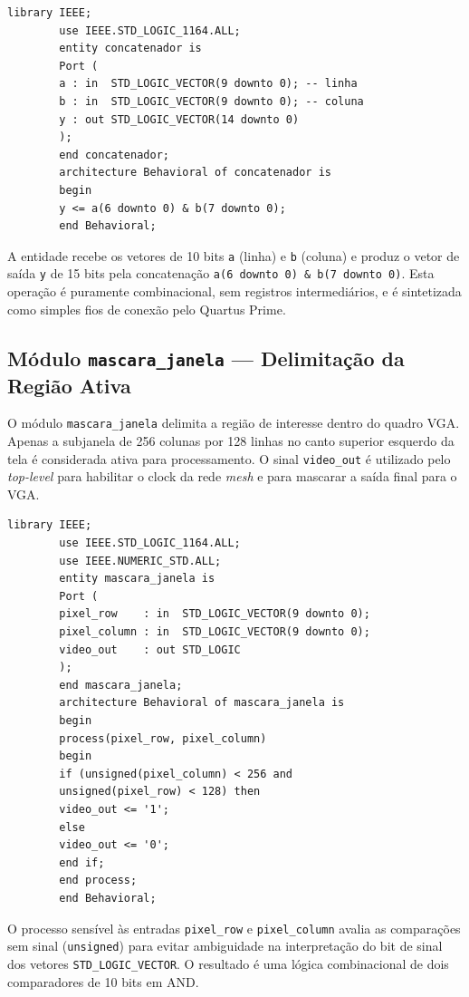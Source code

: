 \documentclass[12pt, a4paper]{article}
\begin{document}
	\begin{lstlisting}[style=vhdl, caption={\texttt{concatenador.vhd} --- Concatenação de coordenadas de pixel para endereçamento da ROM de imagem.}, label={lst:concat}]
		library IEEE;
		use IEEE.STD_LOGIC_1164.ALL;
		entity concatenador is
		Port (
		a : in  STD_LOGIC_VECTOR(9 downto 0); -- linha
		b : in  STD_LOGIC_VECTOR(9 downto 0); -- coluna
		y : out STD_LOGIC_VECTOR(14 downto 0)
		);
		end concatenador;
		architecture Behavioral of concatenador is
		begin
		y <= a(6 downto 0) & b(7 downto 0);
		end Behavioral;
	\end{lstlisting}
	
	A entidade recebe os vetores de 10 bits \texttt{a} (linha) e \texttt{b}
	(coluna) e produz o vetor de saída \texttt{y} de 15 bits pela concatenação
	\texttt{a(6 downto 0) \& b(7 downto 0)}. Esta operação é puramente
	combinacional, sem registros intermediários, e é sintetizada como simples
	fios de conexão pelo Quartus Prime.
	
	\subsection{Módulo \texttt{mascara\_janela} --- Delimitação da Região Ativa}
	
	O módulo \texttt{mascara\_janela} delimita a região de interesse dentro do
	quadro VGA. Apenas a subjanela de 256 colunas por 128 linhas no canto
	superior esquerdo da tela é considerada ativa para processamento. O sinal
	\texttt{video\_out} é utilizado pelo \textit{top-level} para habilitar o
	clock da rede \textit{mesh} e para mascarar a saída final para o VGA.
	
	\begin{lstlisting}[style=vhdl, caption={\texttt{mascara\_janela.vhd} --- Geração do sinal de máscara para delimitação da região ativa de processamento.}, label={lst:mascara}]
		library IEEE;
		use IEEE.STD_LOGIC_1164.ALL;
		use IEEE.NUMERIC_STD.ALL;
		entity mascara_janela is
		Port (
		pixel_row    : in  STD_LOGIC_VECTOR(9 downto 0);
		pixel_column : in  STD_LOGIC_VECTOR(9 downto 0);
		video_out    : out STD_LOGIC
		);
		end mascara_janela;
		architecture Behavioral of mascara_janela is
		begin
		process(pixel_row, pixel_column)
		begin
		if (unsigned(pixel_column) < 256 and
		unsigned(pixel_row) < 128) then
		video_out <= '1';
		else
		video_out <= '0';
		end if;
		end process;
		end Behavioral;
	\end{lstlisting}
	
	O processo sensível às entradas \texttt{pixel\_row} e \texttt{pixel\_column}
	avalia as comparações sem sinal (\texttt{unsigned}) para evitar ambiguidade
	na interpretação do bit de sinal dos vetores \texttt{STD\_LOGIC\_VECTOR}.
	O resultado é uma lógica combinacional de dois comparadores de 10 bits em AND.
	
\end{document}
